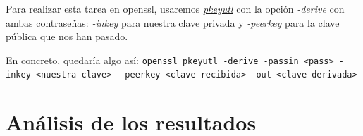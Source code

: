 \documentclass[a4paper, 11pt]{article}
\begin{document}
			Para realizar esta tarea en openssl, usaremos \href{https://www.openssl.org/docs/man1.0.2/apps/pkeyutl.html}
			{\textit{pkeyutl}} con la opción \textit{-derive} con ambas contraseñas: \textit{-inkey} para nuestra clave privada
			y \textit{-peerkey} para la clave pública que nos han pasado.
			
			En concreto, quedaría algo así:
			\verb|openssl pkeyutl -derive -passin <pass> -inkey <nuestra clave>|
			\verb| -peerkey <clave recibida> -out <clave derivada>|

\section{Análisis de los resultados}
	
\end{document}
